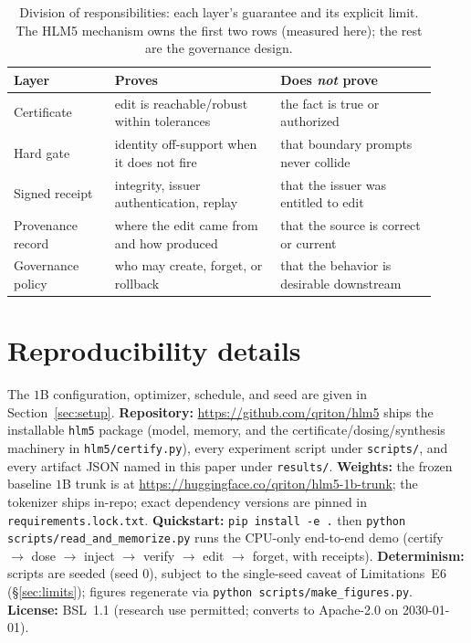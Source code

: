 \documentclass[10pt,twocolumn]{article}
\theoremstyle{remark}
\begin{document}
\begin{table}[t]
\centering\small
\begin{tabular}{p{0.22\linewidth} p{0.36\linewidth} p{0.34\linewidth}}
\toprule
Layer & Proves & Does \emph{not} prove \\
\midrule
Certificate & edit is reachable/robust within tolerances & the fact is true or authorized \\
Hard gate & identity off-support when it does not fire & that boundary prompts never collide \\
Signed receipt & integrity, issuer authentication, replay & that the issuer was entitled to edit \\
Provenance record & where the edit came from and how produced & that the source is correct or current \\
Governance policy & who may create, forget, or rollback & that the behavior is desirable downstream \\
\bottomrule
\end{tabular}
\caption{Division of responsibilities: each layer's guarantee and its explicit
limit. The HLM5 mechanism owns the first two rows (measured here); the rest are the
governance design.}
\label{tab:governance}
\end{table}

\section{Reproducibility details}
The $1$B configuration, optimizer, schedule, and seed are given in
Section~\ref{sec:setup}. \textbf{Repository:} \url{https://github.com/qriton/hlm5}
ships the installable \texttt{hlm5} package (model, memory, and the
certificate/dosing/synthesis machinery in \texttt{hlm5/certify.py}), every
experiment script under \texttt{scripts/}, and every artifact JSON named in this
paper under \texttt{results/}. \textbf{Weights:} the frozen baseline $1$B trunk is
at \url{https://huggingface.co/qriton/hlm5-1b-trunk}; the tokenizer ships in-repo;
exact dependency versions are pinned in \texttt{requirements.lock.txt}.
\textbf{Quickstart:} \texttt{pip install -e .} then
\texttt{python scripts/read\_and\_memorize.py} runs the CPU-only end-to-end demo
(certify $\to$ dose $\to$ inject $\to$ verify $\to$ edit $\to$ forget, with
receipts). \textbf{Determinism:} scripts are seeded (seed $0$), subject to the
single-seed caveat of Limitations~E6 (\S\ref{sec:limits}); figures regenerate via
\texttt{python scripts/make\_figures.py}. \textbf{License:} BSL~1.1 (research use
permitted; converts to Apache-2.0 on 2030-01-01).
\end{document}
